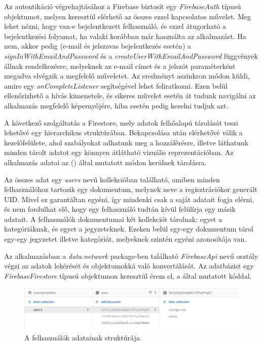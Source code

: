 Az autentikáció végrehajtásához a Firebase biztosít egy \emph{FirebaseAuth} típusú objektumot, melyen keresztül elérhető az összes ezzel kapcsolatos művelet. Meg lehet nézni, hogy van-e bejelentkezett felhasználó, és ezzel átugorható a bejelentkezési folyamat, ha valaki korábban már használta az alkalmazást. Ha nem, akkor pedig (e-mail és jelszavas bejelentkezés esetén) a \emph{signInWithEmailAndPassword} és a \emph{createUserWithEmailAndPassword} függvények állnak rendelkezésre, melyeknek az e-mail címet és a jelszót paraméterként megadva elvégzik a megfelelő műveletet. Az eredményt aszinkron módon küldi, amire egy \emph{onCompleteListener} segítségével lehet feliratkozni. Ezen belül ellenőrizhető a hívás kimenetele, és sikeres művelet esetén át tudunk navigálni az alkalmazás megfelelő képernyőjére, hiba esetén pedig kezelni tudjuk azt.

A következő szolgáltatás a Firestore, mely adatok felhőalapú tárolását teszi lehetővé egy hierarchikus struktúrában. Bekapcsolása után elérhetővé válik a kezelőfelülete, ahol szabályokat adhatunk meg a hozzáférésre, illetve láthatunk minden tárolt adatot egy könnyen átlátható vizuális reprezentációban. Az alkalmazás adatai az () által mutatott módon kerülnek tárolásra.

Az összes adat egy \emph{users} nevű kollekcióban található, amiben minden felhasználóhoz tartozik egy dokumentum, melynek neve a regisztrációkor generált UID. Mivel ez garantáltan egyéni, így mindenki csak a saját adatait fogja elérni, és nem fordulhat elő, hogy egy felhasználó tudtán kívül felülírja egy másik adatait. A felhasználók dokumentumai két kollekciót tárolnak: egyet a kategóriáknak, és egyet a jegyzeteknek. Ezeken belül egy-egy dokumentum tárol egy-egy jegyzetet illetve kategóriát, melyeknek szintén egyéni azonosítója van.

Az alkalmazásban a \emph{data.network} package-ben található \emph{FirebaseApi} nevű osztály végzi az adatok lekérését és objektumokká való konvertálását. Az adatbázist egy \emph{FirebaseFirestore} típusú objektumon keresztül érem el, a  által mutatott kóddal.

\begin{figure}[!ht]
	\centering
	\includegraphics[width=150mm, keepaspectratio]{figures/firestore.png}
	\caption{A felhasználók adatainak struktúrája.}
	\label{fig:Firestore}
\end{figure}


